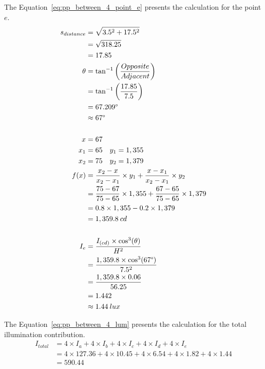 The Equation~\ref{eq:pp_between_4_point_e} presents the calculation for the point $e$.
\begin{equation}
\begin{split}
s_{distance} & = \sqrt{3.5^2 + 17.5^2} \\
 & = \sqrt{318.25} \\
 & = 17.85 \\
\theta &= \tan^{-1}\left( \frac{Opposite}{Adjacent} \right) \\
 & = \tan^{-1}\left( \frac{17.85}{7.5} \right) \\
 & = 67.209\degree \\
 & \approx 67\degree\\
\\
x & = 67 \\
x_1 & = 65 \quad y_1 = 1,355 \\
x_2 & = 75 \quad y_2 = 1,379 \\
f(x) &= \frac{x_2 - x}{x_2 - x_1} \times y_1 +
       \frac{x - x_1}{x_2 - x_1} \times y_2 \\
 &= \frac{75 - 67}{75 - 65} \times 1,355 +
    \frac{67 - 65}{75 - 65} \times 1,379 \\
 & = 0.8 \times 1,355 - 0.2 \times 1,379 \\
 & = 1,359.8\: cd \\
\\
I_e &= \frac{I_{(cd)} \times \cos^3(\theta)}{H^2} \\
 &= \frac{1,359.8 \times \cos^3(67\degree)}{7.5^2} \\
 &= \frac{1,359.8 \times 0.06}{56.25} \\
 & = 1.442 \\
 & \approx 1.44\: lux
\end{split}
\label{eq:pp_between_4_point_e}
\end{equation}

The Equation~\ref{eq:pp_between_4_lum} presents the calculation for the total illumination contribution.
\begin{equation}
\begin{split}
I_{total} &= 4 \times I_a + 4 \times I_b + 4 \times I_c + 4 \times I_d + 4 \times I_e \\
 &= 4 \times 127.36 + 4 \times 10.45 + 4 \times 6.54 + 4 \times 1.82 + 4 \times 1.44 \\
 & = 590.44 \\
\end{split}
\label{eq:pp_between_4_lum}
\end{equation}

